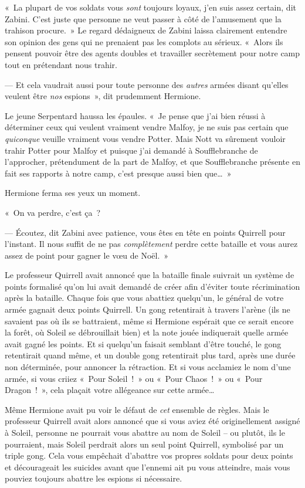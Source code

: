 «~La plupart de vos soldats vous \emph{sont} toujours loyaux, j'en suis assez certain, dit Zabini. C'est juste que personne ne veut passer à côté de l'amusement que la trahison procure.~» Le regard dédaigneux de Zabini laissa clairement entendre son opinion des gens qui ne prenaient pas les complots au sérieux. «~Alors ils pensent pouvoir être des agents doubles et travailler secrètement pour notre camp tout en prétendant nous trahir.

--- Et cela vaudrait aussi pour toute personne des \emph{autres} armées disant qu'elles veulent être \emph{nos} espions~», dit prudemment Hermione.

Le jeune Serpentard haussa les épaules. «~Je pense que j'ai bien réussi à déterminer ceux qui veulent vraiment vendre Malfoy, je ne suis pas certain que \emph{quiconque} veuille vraiment vous vendre Potter. Mais Nott va sûrement vouloir trahir Potter pour Malfoy et puisque j'ai demandé à Soufflebranche de l'approcher, prétendument de la part de Malfoy, et que Soufflebranche présente en fait ses rapports à notre camp, c'est presque aussi bien que…~»

Hermione ferma ses yeux un moment.

«~On va perdre, c'est ça~?

--- Écoutez, dit Zabini avec patience, vous êtes en tête en points Quirrell pour l'instant. Il nous suffit de ne pas \emph{complètement} perdre cette bataille et vous aurez assez de point pour gagner le vœu de Noël.~»

Le professeur Quirrell avait annoncé que la bataille finale suivrait un système de points formalisé qu'on lui avait demandé de créer afin d'éviter toute récrimination après la bataille. Chaque fois que vous abattiez quelqu'un, le général de votre armée gagnait deux points Quirrell. Un gong retentirait à travers l'arène (ils ne savaient pas où ils se battraient, même si Hermione espérait que ce serait encore la forêt, où Soleil se débrouillait bien) et la note jouée indiquerait quelle armée avait gagné les points. Et si quelqu'un faisait semblant d'être touché, le gong retentirait quand même, et un double gong retentirait plus tard, après une durée non déterminée, pour annoncer la rétraction. Et si vous acclamiez le nom d'une armée, si vous criiez «~Pour Soleil~!~» ou «~Pour Chaos~!~» ou «~Pour Dragon~!~», cela plaçait votre allégeance sur cette armée…

Même Hermione avait pu voir le défaut de \emph{cet} ensemble de règles. Mais le professeur Quirrell avait alors annoncé que si vous aviez été originellement assigné à Soleil, personne ne pourrait vous abattre au nom de Soleil -- ou plutôt, ils le pourraient, mais Soleil perdrait alors un seul point Quirrell, symbolisé par un triple gong. Cela vous empêchait d'abattre vos propres soldats pour deux points et décourageait les suicides avant que l'ennemi ait pu vous atteindre, mais vous pouviez toujours abattre les espions si nécessaire.

